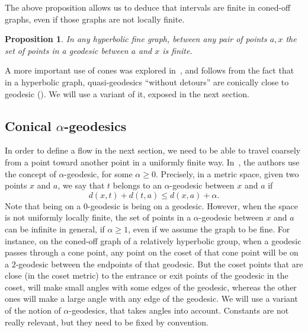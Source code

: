 \documentclass[11pt]{article}
\newtheorem{prop}[theo]{Proposition}
\theoremstyle{definition}
\numberwithin{equation}{section}
\begin{document}
The above proposition allows us to deduce that intervals are finite in coned-off graphs, even if those graphs are not locally finite.

\begin{prop}\label{prop;geod_finite}
In any hyperbolic fine graph, between any pair of points $a,x$ the set of points in a geodesic between $a$ and $x$ is finite.
\end{prop}

A more important use of cones was explored in~\cite{Israel}, and follows from the fact that in a hyperbolic graph, quasi-geodesics ``without detours'' are conically close to geodesic (\cite[Prop.~1.11]{Israel}). We will use a variant of it, exposed in the next section.

\subsection{Conical \texorpdfstring{$\alpha$}{alpha}-geodesics}

In order to define a flow in the next section, we need to be able to travel coarsely from a point toward another point in a uniformly finite way. In~\cite{AL}, the authors use the concept of $\alpha$-geodesic, for some $\alpha\geq 0$. Precisely, in a metric space, given two points $x$ and $a$, we say that $t$ belongs to an $\alpha$-geodesic between $x$ and $a$ if
\[
d(x,t)+d(t,a)\leq d(x,a)+\alpha.
\]
Note that being on a $0$-geodesic is being on a geodesic. However, when the space is not uniformly locally finite, the set of points in a $\alpha$-geodesic between $x$ and $a$ can be infinite in general, if $\alpha \geq 1$, even if we assume the graph to be fine. For instance, on the coned-off graph of a relatively hyperbolic group, when a geodesic passes through a cone point, any point on the coset of that cone point will be on a $2$-geodesic between the endpoints of that geodesic. But the coset points that are close (in the coset metric) to the entrance or exit points of the geodesic in the coset, will make small angles with some edges of the geodesic, whereas the other ones will make a large angle with any edge of the geodesic. We will use a variant of the notion of $\alpha$-geodesics, that takes angles into account. Constants are not really relevant, but they need to be fixed by convention.
\end{document}
